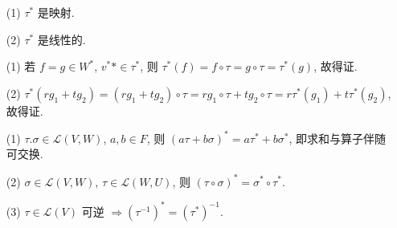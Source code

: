 \documentclass{note}
\begin{document}
\begin{itemize}
    \item[(1)] $\tau^*$ 是映射.
    \item[(2)] $\tau^*$ 是线性的.
\end{itemize}
\begin{pf}
    \begin{itemize}
        \item[(1)] 若 $f=g\in W^*$, $v^**\in\tau^*$, 则 $\tau^*(f)=f\circ\tau=g\circ\tau=\tau^*(g)$, 故得证.
        \item[(2)] $\tau^*(rg_1+tg_2)=(rg_1+tg_2)\circ\tau=rg_1\circ\tau+tg_2\circ\tau=r\tau^*(g_1)+t\tau^*(g_2)$, 故得证.
    \end{itemize}
\end{pf}

\begin{thm}[(课本定理 3.18)]
    \begin{itemize}
        \item[(1)] $\tau.\sigma\in\mathcal{L}(V,W)$, $a,b\in F$, 则 $(a\tau+b\sigma)^*=a\tau^*+b\sigma^*$, 即求和与算子伴随可交换.
        \item[(2)] $\sigma\in\mathcal{L}(V,W)$, $\tau\in\mathcal{L}(W,U)$, 则 $(\tau\circ\sigma)^*=\sigma^*\circ\tau^*$.
        \item[(3)] $\mathcal{\tau}\in\mathcal{L}(V)$ 可逆 $\Longrightarrow(\tau^{-1})^*=(\tau^*)^{-1}$.
    \end{itemize}
\end{thm}
\end{document}
